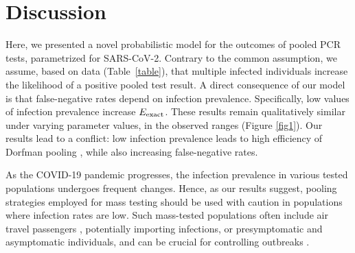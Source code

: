 \documentclass{article}
\begin{document}
\section*{Discussion}
Here, we presented a novel probabilistic model for the outcomes of
pooled PCR tests, parametrized for SARS-CoV-2. Contrary to the common
assumption, we assume, based on data (Table~\ref{table}), that multiple
infected individuals increase the likelihood of a positive pooled test
result. A direct consequence of our model is that false-negative rates
depend on infection prevalence. Specifically, low values of infection
prevalence increase $E_{\text{{exact}}}$. These results remain qualitatively
similar under varying parameter values, in the observed ranges
\cite{KitComparison,EstimatingRatesKucrika, EstimatingRatesLourenco,
  InterpretingCOVID19Test} (Figure \ref{fig1}).
Our results lead to a conflict: low infection prevalence leads to high
efficiency of Dorfman pooling \cite{DorfmanYuvalDor}, while also
increasing false-negative rates. 

As the COVID-19 pandemic progresses, the infection prevalence
in various tested populations undergoes frequent changes. Hence, as
our results suggest, pooling strategies employed for mass testing should be
used with caution in populations where infection rates are low. Such
mass-tested populations often include air travel passengers
\cite{JTM,RobinHood}, potentially importing infections, or
presymptomatic and asymptomatic individuals, and can be crucial for
controlling outbreaks \cite{MinaScience}.

\end{document}
